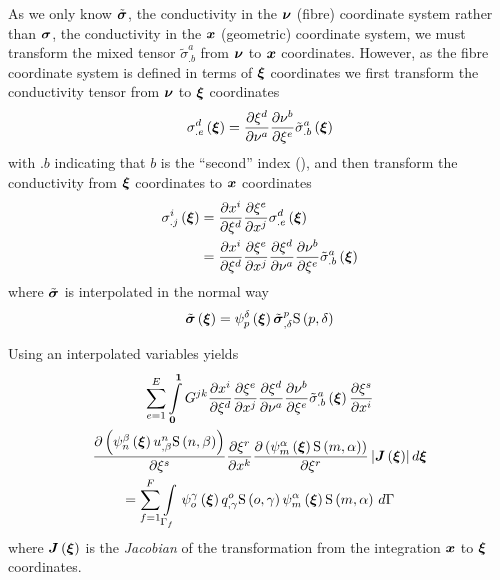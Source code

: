 As we only know $\tilde{\boldsymbol{\mathit{\sigma}}}$, the conductivity in the 
$\boldsymbol{\nu}$ (fibre) coordinate system rather than $\boldsymbol{\mathit{\sigma}}$, the
conductivity in the $\boldsymbol{x}$ (geometric) coordinate system, we must transform the mixed
tensor ${\tilde{\sigma}}^{a}_{.b}$ from $\boldsymbol{\nu}$ to $\boldsymbol{x}$ coordinates. However, as the
fibre coordinate system is defined in terms of $\boldsymbol{\xi}$ coordinates we
first transform the conductivity tensor from $\boldsymbol{\nu}$ to $\boldsymbol{\xi}$
coordinates \ie
\begin{equation}
   \sigma^{d}_{.e}\left( \boldsymbol{\xi} \right) = \dfrac{\partial \xi^{d}}{\partial \nu^{a}}  \dfrac{\partial \nu^{b}}{\partial \xi^{e}} 
   {\tilde{\sigma}}^{a}_{.b}\left( \boldsymbol{\xi} \right) 
\end{equation}
with $.b$ indicating that $b$ is the ``second'' index (),
and then transform the conductivity from $\boldsymbol{\xi}$ coordinates to
$\boldsymbol{x}$ coordinates \ie
\begin{equation}
  \begin{split}
     \sigma^{i}_{.j}\left( \boldsymbol{\xi} \right)  &=
     \dfrac{\partial x^{i}}{\partial \xi^{d}}  \dfrac{\partial \xi^{e}}{\partial x^{j}} 
     {\sigma}^{d}_{.e}\left( \boldsymbol{\xi} \right)  \\
    &=  \dfrac{\partial x^{i}}{\partial \xi^{d}}  \dfrac{\partial \xi^{e}}{\partial x^{j}}  \dfrac{\partial \xi^{d}}{\partial \nu^{a}}  \dfrac{\partial \nu^{b}}{\partial \xi^{e}}  {\tilde{\sigma}}^{a}_{.b}\left( \boldsymbol{\xi} \right) 
  \end{split}
\end{equation}
where $\tilde{\boldsymbol{\mathit{\sigma}}}$ is interpolated in the normal way \ie
\begin{equation}
   \tilde{\boldsymbol{\mathit{\sigma}}}\left( \boldsymbol{\xi} \right) 
  =   \psi_{p}^{\delta} \left( \boldsymbol{\xi} \right)    {\tilde{\boldsymbol{\mathit{\sigma}}}}^{p} _{,\delta} 
     \mathrm{S} \left( p,\delta \right)  
\end{equation}

Using an interpolated variables yields
\begin{multline}
  \dsum_{e=1}^{E}\dintl{\vectr{0}}{\vectr{1}}G^{jk}\delby{x^{i}}{\xi^{d}}
    \delby{\xi^{e}}{x^{j}}\delby{\xi^{d}}{\nu^{a}}
    \delby{\nu^{b}}{\xi^{e}}\fnof{{\tilde{\sigma}}^{a}_{.b}}{\vectr{\xi}}\delby{\xi^{s}}{x^{i}} \\
    \delby{\pbrac{\gbfn{n}{\beta}{\vectr{\xi}}\nodedof{u}{n}{\beta}\gsf{n}{\beta}}}{\xi^{s}}
    \delby{\xi^{r}}{x^{k}}\delby{\pbrac{\gbfn{m}{\alpha}{\vectr{\xi}}\gsf{m}{\alpha}}}{\xi^{r}}
    \abs{\fnof{\matr{J}}{\vectr{\xi}}}d\vectr{\xi} \\ 
  = \dsum_{f=1}^{F}\gint{\Gamma_{f}}{}{\gbfn{o}{\gamma}{\vectr{\xi}}\nodedof{q}{o}{\gamma}
    \gsf{o}{\gamma}\gbfn{m}{\alpha}{\vectr{\xi}}\gsf{m}{\alpha}}{\Gamma}
\end{multline}
where $\fnof{\matr{J}}{\vectr{\xi}}$ is the \emph{Jacobian} of the
transformation from the integration $\boldsymbol{x}$ to $\boldsymbol{\xi}$ coordinates.

